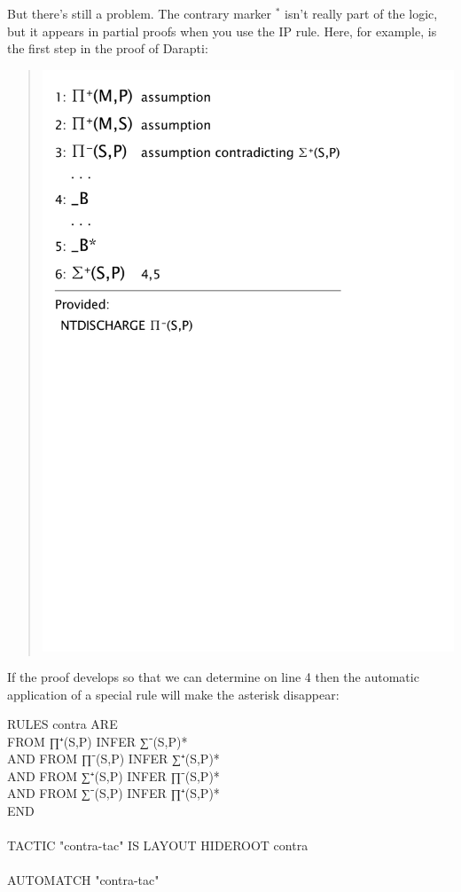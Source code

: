 But there's still a problem. The contrary marker $^{*}$ isn't really part of the logic, but it appears in partial proofs when you use the IP rule. Here, for example, is the first step in the proof of Darapti:
\begin{quote}
\includegraphics[scale=0.5]{pics/Aristotle/Darapti_0}
\end{quote}
If the proof develops so that we can determine  on line 4 then the automatic application of a special rule will make the asterisk disappear:
\begin{japeish}
RULES contra ARE \\
\tab\tab\tab   FROM ∏⁺(S,P) INFER ∑⁻(S,P)*  \\
\tab AND FROM ∏⁻(S,P) INFER ∑⁺(S,P)*    \\  
\tab AND FROM ∑⁺(S,P) INFER ∏⁻(S,P)*  \\
\tab AND FROM ∑⁻(S,P) INFER ∏⁺(S,P)*  \\
END\\
\\
TACTIC "contra-tac" IS LAYOUT HIDEROOT contra\\
\\
AUTOMATCH "contra-tac"
\end{japeish}
